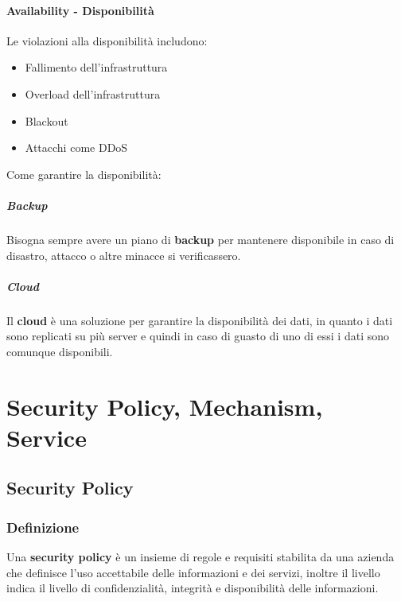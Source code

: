         \paragraph{Availability - Disponibilità}
            Le violazioni alla disponibilità includono:
            \begin{itemize}
                \item Fallimento dell'infrastruttura 
                \item Overload dell'infrastruttura
                \item Blackout
                \item Attacchi come DDoS
            \end{itemize}
            Come garantire la disponibilità:
            \subparagraph{Backup} Bisogna sempre avere un piano di \textbf{backup} per mantenere disponibile in caso di disastro, attacco o altre minacce si verificassero.
            \subparagraph{Cloud} Il \textbf{cloud} è una soluzione per garantire la disponibilità dei dati, in quanto i dati sono replicati su più server e quindi in caso di guasto di uno di essi i dati sono comunque disponibili.
        
\section{Security Policy, Mechanism, Service}
    \subsection{Security Policy}
            \subsubsection{Definizione}
                Una \textbf{security policy} è un insieme di regole e requisiti stabilita da una azienda che definisce l'uso accettabile delle informazioni e dei servizi, inoltre il livello indica il livello di confidenzialità, integrità e disponibilità delle informazioni.
